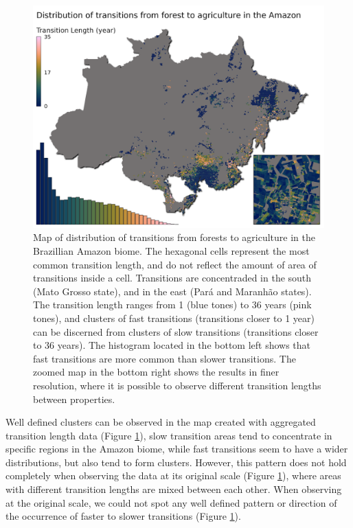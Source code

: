 \documentclass[essd, manuscript]{copernicus}
\begin{document}
\begin{figure}[ht]
\includegraphics[width=17cm]{figs/map} \caption{Map of distribution of transitions from forests to agriculture in the Brazillian Amazon biome. The hexagonal cells represent the most common transition length, and do not reflect the amount of area of transitions inside a cell. Transitions are concentraded in the south (Mato Grosso state), and in the east (Pará and Maranhão states). The transition length ranges from 1 (blue tones) to 36 years (pink tones), and clusters of fast transitions (transitions closer to 1 year) can be discerned from clusters of slow transitions (transitions closer to 36 years). The histogram located in the bottom left shows that fast transitions are more common than slower transitions. The zoomed map in the bottom right shows the results in finer resolution, where it is possible to observe different transition lengths between properties.}\label{fig:map-plot}
\end{figure}

Well defined clusters can be observed in the map created with aggregated transition length data (Figure \ref{fig:map-plot}), slow transition areas tend to concentrate in specific regions in the Amazon biome, while fast transitions seem to have a wider distributions, but also tend to form clusters.
However, this pattern does not hold completely when observing the data at its original scale (Figure \ref{fig:map-plot}), where areas with different transition lengths are mixed between each other.
When observing at the original scale, we could not spot any well defined pattern or direction of the occurrence of faster to slower transitions (Figure \ref{fig:map-plot}).
\end{document}
